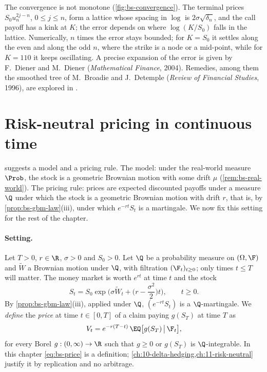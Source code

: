 \begin{remark}\label{rem:bs-oscillation}
The convergence is not monotone (\cref{fig:bs-convergence}). The terminal prices
$S_0u_n^{2j-n}$, $0\le j\le n$, form a lattice whose spacing in $\log$ is $2\sigma\sqrt{\delta_n}$, and
the call payoff has a kink at $K$; the error depends on where $\log(K/S_0)$ falls in the
lattice. Numerically, $n$ times the error stays bounded; for $K=S_0$ it settles along the
even and along the odd $n$, where the strike is a node or a mid-point, while for $K=110$ it
keeps oscillating. A precise expansion of the error is given by F.~Diener and M.~Diener
(\emph{Mathematical Finance}, 2004). Remedies, among them the smoothed tree of M.~Broadie and
J.~Detemple (\emph{Review of Financial Studies}, 1996), are explored in .
\end{remark}


\section{Risk-neutral pricing in continuous time}\label{sec:bs-pricing}

 suggests a model and a pricing rule. The model: under the real-world
measure $\Prob$, the stock is a geometric Brownian motion with some drift $\mu$
(\cref{rem:bs-real-world}). The pricing rule: prices are expected discounted payoffs under
a measure $\Q$ under which the stock is a geometric Brownian motion with drift $r$, that
is, by \cref{prop:bs-gbm-law}(iii), under which $e^{-rt}S_t$ is a martingale. We now fix this
setting for the rest of the chapter.

\paragraph{Setting.} Let $T>0$, $r\in\R$, $\sigma>0$ and $S_0>0$. Let $\Q$ be a probability
measure on $(\Omega,\F)$ and $\widetilde W$ a Brownian motion under $\Q$, with filtration
$(\F_t)_{t\ge0}$; only times $t\le T$ will matter. The money market is worth $e^{rt}$ at time $t$ and the stock
\begin{equation}\label{eq:bs-model}
  S_t=S_0\exp\Big(\sigma\widetilde W_t+\Big(r-\frac{\sigma^2}2\Big)t\Big),\qquad t\ge0 .
\end{equation}
By \cref{prop:bs-gbm-law}(iii), applied under $\Q$, $(e^{-rt}S_t)$ is a $\Q$-martingale. We
\emph{define} the \emph{price} at time $t\in[0,T]$ of a claim paying $g(S_T)$ at time $T$ as
\begin{equation}\label{eq:bs-price}
  V_t=e^{-r(T-t)}\,\EQ\big[g(S_T)\,\big|\,\F_t\big],
\end{equation}
for every Borel $g:(0,\infty)\to\R$ such that $g\ge0$ or $g(S_T)$ is $\Q$-integrable. In this
chapter \eqref{eq:bs-price} is a definition; \cref{ch:10-delta-hedging,ch:11-risk-neutral}
justify it by replication and no arbitrage.

